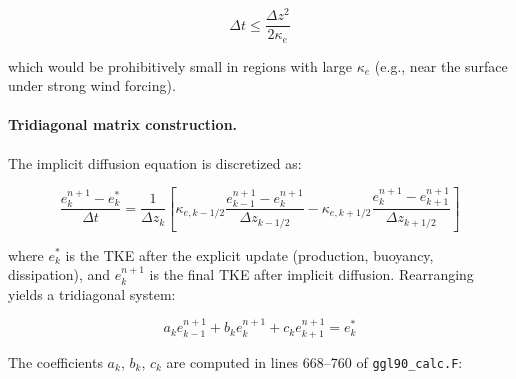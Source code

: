 \documentclass[12pt,letterpaper]{article}
\begin{document}
\begin{equation}
\Delta t \leq \frac{\Delta z^2}{2 \kappa_e}
\end{equation}

which would be prohibitively small in regions with large $\kappa_e$ (e.g., near the surface under strong wind forcing).

\paragraph{Tridiagonal matrix construction.} The implicit diffusion equation is discretized as:

\begin{equation}
\frac{e^{n+1}_k - e^*_k}{\Delta t} = \frac{1}{\Delta z_k} \left[
\kappa_{e,k-1/2} \frac{e^{n+1}_{k-1} - e^{n+1}_k}{\Delta z_{k-1/2}}
- \kappa_{e,k+1/2} \frac{e^{n+1}_k - e^{n+1}_{k+1}}{\Delta z_{k+1/2}}
\right]
\label{eq:tke_implicit_diffusion}
\end{equation}

where $e^*_k$ is the TKE after the explicit update (production, buoyancy, dissipation), and $e^{n+1}_k$ is the final TKE after implicit diffusion. Rearranging yields a tridiagonal system:

\begin{equation}
a_k e^{n+1}_{k-1} + b_k e^{n+1}_k + c_k e^{n+1}_{k+1} = e^*_k
\label{eq:tke_tridiagonal}
\end{equation}

The coefficients $a_k$, $b_k$, $c_k$ are computed in lines 668--760 of \verb|ggl90_calc.F|:
\end{document}
